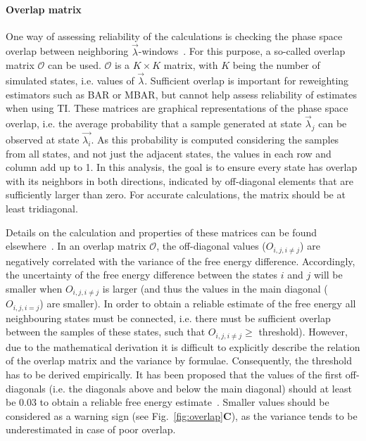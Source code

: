 \documentclass[9pt,bestpractices,pubversion]{livecoms}
\begin{document}
\paragraph{Overlap matrix}
One way of assessing reliability of the calculations is checking the phase space overlap between neighboring $\vec{\lambda}$-windows~\cite{wu2005phasespace, wu2005phasespacea}. For this purpose, a so-called overlap matrix $\mathcal{O}$ can be used. $\mathcal{O}$ is a $K\times K$ matrix, with $K$ being the number of simulated states, i.e. values of $\vec{\lambda}$. Sufficient overlap is important for reweighting estimators such as BAR or MBAR, but cannot help assess reliability of estimates when using TI. 
These matrices are graphical representations of the phase space overlap, i.e. the average probability that a sample generated at state $\vec{\lambda}_{j}$ can be observed at state $\vec{\lambda_{i}}$. As this probability is computed considering the samples from all states, and not just the adjacent states, the values in each row and column add up to 1. In this analysis, the goal is to ensure every state has overlap with its neighbors in both directions, indicated by off-diagonal elements that are sufficiently larger than zero. For accurate calculations, the matrix should be at least tridiagonal.

Details on the calculation and properties of these matrices can be found elsewhere~\cite{klimovich2015guidelines}.
In an overlap matrix $\mathcal{O}$, the off-diagonal values (${O}_{i,j,i\ne j}$) are negatively correlated with the variance of the free energy difference. Accordingly, the uncertainty of the free energy difference between the states $i$ and $j$ will be smaller when ${O}_{i,j,i\ne j}$ is larger (and thus the values in the main diagonal (${O}_{i,j,i=j}$) are smaller). In order to obtain a reliable estimate of the free energy all neighbouring states must be connected, i.e. there must be sufficient overlap between the samples of these states, such that ${O}_{i,j,i\ne j}\ge$ threshold).
However, due to the mathematical derivation it is difficult to explicitly describe the relation of the overlap matrix and the variance by formulae. Consequently, the threshold has to be derived empirically. It has been proposed that the values of the first off-diagonals (i.e. the diagonals above and below the main diagonal) should at least be 0.03 to obtain a reliable free energy estimate~\cite{klimovich2015guidelines}. Smaller values should be considered as a warning sign (see Fig.~\ref{fig:overlap}\textbf{C}), as the variance tends to be underestimated in case of poor overlap.
\end{document}
